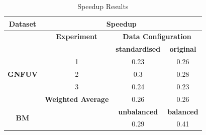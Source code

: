 \documentclass{mpaper}
\begin{document}
\begin{table}[]
\centering
\begin{tabular}{|c|ccc|}
\hline
\textbf{Dataset}             & \multicolumn{3}{c|}{\textbf{Speedup}}                                                             \\ \hline
                             & \multicolumn{1}{c|}{\textbf{Experiment}}       & \multicolumn{2}{c|}{\textbf{Data Configuration}} \\ \cline{2-4} 
                             & \multicolumn{1}{l|}{}                          & \textbf{standardised}     & \textbf{original}    \\ \cline{2-4} 
                             & \multicolumn{1}{c|}{1}                         & 0.23                      & 0.26                 \\
\textbf{GNFUV}               & \multicolumn{1}{c|}{2}                         & 0.3                       & 0.28                 \\
                             & \multicolumn{1}{c|}{3}                         & 0.24                      & 0.23                 \\ \cline{2-4} 
                             & \multicolumn{1}{c|}{\textbf{Weighted Average}} & 0.26                      & 0.26                 \\ \hline
\multirow{2}{*}{\textbf{BM}} & \multicolumn{1}{l|}{}                          & \textbf{unbalanced}       & \textbf{balanced}    \\ \cline{3-4} 
                             & \multicolumn{1}{c|}{\textbf{}}                 & 0.29                      & 0.41                 \\ \hline
\end{tabular}
\caption{\label{tab:speedup}Speedup Results}
\end{table}






\end{document}
